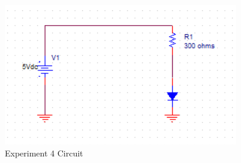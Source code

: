 \begin{figure}[h!]
	\centering
	\includegraphics{CircuitSchematic.PNG}
	\caption{Experiment 4 Circuit}
	\label{fig:Circuit_Pic}
\end{figure}


